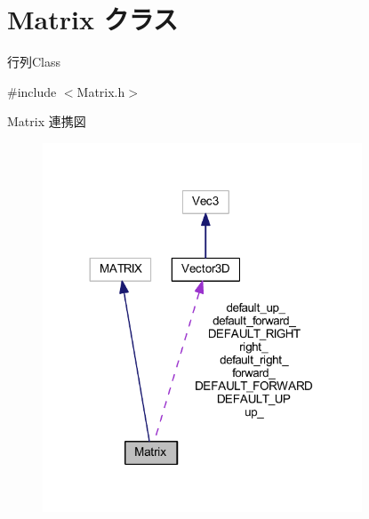 \hypertarget{class_matrix}{}\section{Matrix クラス}
\label{class_matrix}


行列\+Class  




{\ttfamily \#include $<$Matrix.\+h$>$}



Matrix 連携図\nopagebreak
\begin{figure}[H]
\begin{center}
\leavevmode
\includegraphics[width=269pt]{class_matrix__coll__graph}
\end{center}
\end{figure}
